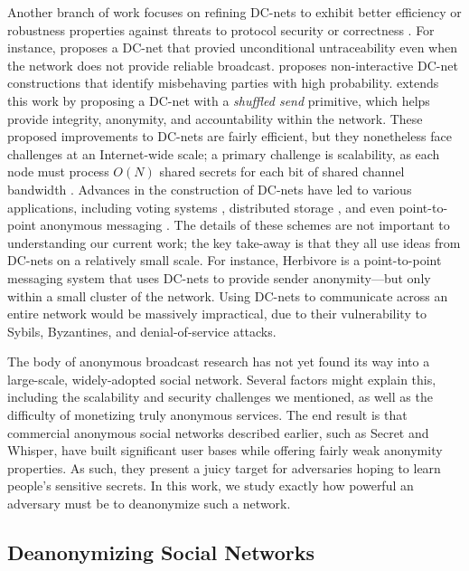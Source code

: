 Another branch of work focuses on refining DC-nets to exhibit better efficiency or robustness properties against threats to protocol security or correctness \cite{waidner1989dining,golle2004dining,corrigan2010dissent}.
For instance, \cite{waidner1989dining} proposes a DC-net that provied unconditional untraceability even when the network does not provide reliable broadcast. \cite{golle2004dining} proposes non-interactive DC-net constructions that identify misbehaving parties with high probability.
\cite{corrigan2010dissent} extends this work by proposing a DC-net with a \emph{shuffled send} primitive, which helps provide integrity, anonymity, and accountability within the network.
These proposed improvements to DC-nets are fairly efficient, but they nonetheless face challenges at an Internet-wide scale; a primary challenge is scalability, as each node must process $O(N)$ shared secrets for each bit of shared channel bandwidth \cite{wolinsky2012dissent}.
Advances in the construction of DC-nets have led to various applications, including voting systems \cite{fujioka1993practical,van2010anonymous}, distributed storage \cite{freeHavenProject}, and even point-to-point anonymous messaging \cite{goel2003herbivore}.
The details of these schemes are not important to understanding our current work; the key take-away is that they all use ideas from DC-nets on a relatively small scale.
For instance, Herbivore \cite{goel2003herbivore} is a point-to-point messaging system that uses DC-nets to provide sender anonymity---but only within a small cluster of the network.
Using DC-nets to communicate across an entire network would be massively impractical, due to their vulnerability to Sybils, Byzantines, and denial-of-service attacks.

The body of anonymous broadcast research has not yet found its way into a large-scale, widely-adopted social network. 
Several factors might explain this, including the scalability and security challenges we mentioned, as well as the difficulty of monetizing truly anonymous services.
The end result is that commercial anonymous social networks described earlier, such as Secret and Whisper, have built significant user bases while offering fairly weak anonymity properties.
As such, they present a juicy target for adversaries hoping to learn people's sensitive secrets.
In this work, we study exactly how powerful an adversary must be to deanonymize such a network.

\subsection{Deanonymizing Social Networks}

